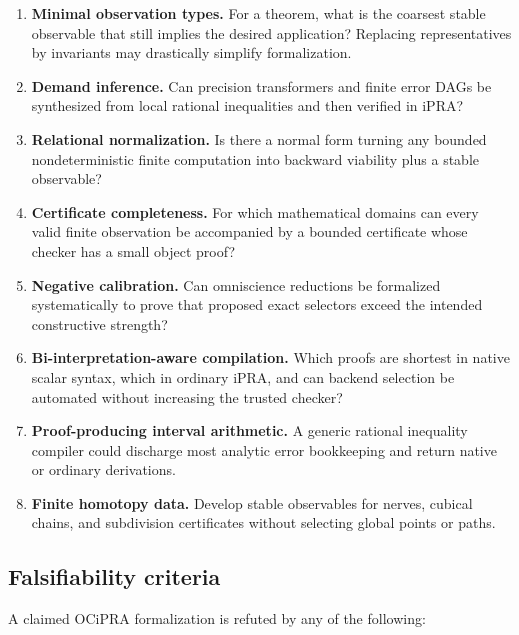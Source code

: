 \begin{enumerate}
  \item \textbf{Minimal observation types.}  For a theorem, what is the coarsest stable observable that still implies the desired application?  Replacing representatives by invariants may drastically simplify formalization.
  \item \textbf{Demand inference.}  Can precision transformers and finite error DAGs be synthesized from local rational inequalities and then verified in iPRA?
  \item \textbf{Relational normalization.}  Is there a normal form turning any bounded nondeterministic finite computation into backward viability plus a stable observable?
  \item \textbf{Certificate completeness.}  For which mathematical domains can every valid finite observation be accompanied by a bounded certificate whose checker has a small object proof?
  \item \textbf{Negative calibration.}  Can omniscience reductions be formalized systematically to prove that proposed exact selectors exceed the intended constructive strength?
  \item \textbf{Bi-interpretation-aware compilation.}  Which proofs are shortest in native scalar syntax, which in ordinary iPRA, and can backend selection be automated without increasing the trusted checker?
  \item \textbf{Proof-producing interval arithmetic.}  A generic rational inequality compiler could discharge most analytic error bookkeeping and return native or ordinary derivations.
  \item \textbf{Finite homotopy data.}  Develop stable observables for nerves, cubical chains, and subdivision certificates without selecting global points or paths.
\end{enumerate}

\subsection{Falsifiability criteria}

A claimed OCiPRA formalization is refuted by any of the following:


